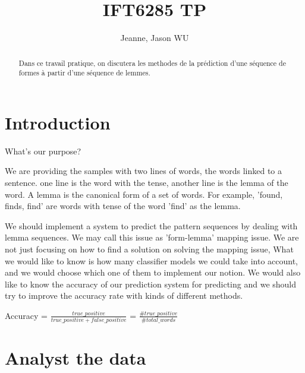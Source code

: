 \documentclass[a4paper]{article}
\title{IFT6285 TP}
\author{Jeanne, Jason WU}
\begin{document}
\maketitle

\begin{abstract}
Dans ce travail pratique,  on discutera les methodes de la prédiction d'une séquence de formes à partir d'une séquence de lemmes.
\end{abstract}

\section{Introduction}
What's our purpose?

We are providing the samples with two lines of words, the words linked to a sentence. one line is the word with the tense, another line is the lemma of the word. A lemma is the canonical form of a set of words. For example, 'found, finds, find' are words with tense of the word 'find' as the lemma.

We should implement a system to predict the pattern sequences by dealing with lemma sequences. We may call this issue as 'form-lemma' mapping issue. We are not just focusing on how to find a solution on solving the mapping issue, What we would like to know is how many classifier models we could take into account, and we would choose which one of them to implement our notion. We would also like to know the accuracy of our prediction system for predicting and we should try to improve the accuracy rate with kinds of different methods.

Accuracy = $\frac{true\_positive}{true\_positive + false\_positive}$ = $\frac{\#true\_positive}{\#total\_words}$

\section{Analyst the data}
\end{document}
